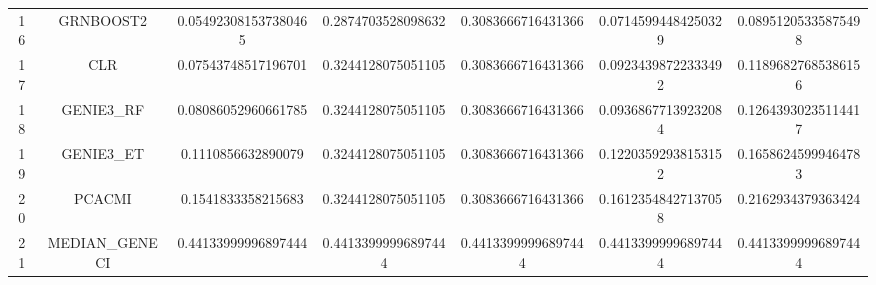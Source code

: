 \documentclass[a4paper,10pt]{article}
\begin{document}
\begin{landscape}
\begin{table}[!htp]
\begin{tabular}{ccccccc}
16&GRNBOOST2&0.054923081537380465&0.2874703528098632&0.3083666716431366&0.07145994484250329&0.08951205335875498\\
17&CLR&0.07543748517196701&0.3244128075051105&0.3083666716431366&0.09234398722333492&0.11896827685386156\\
18&GENIE3_RF&0.08086052960661785&0.3244128075051105&0.3083666716431366&0.09368677139232084&0.12643930235114417\\
19&GENIE3_ET&0.1110856632890079&0.3244128075051105&0.3083666716431366&0.12203592938153152&0.16586245999464783\\
20&PCACMI&0.1541833358215683&0.3244128075051105&0.3083666716431366&0.16123548427137058&0.2162934379363424\\
21&MEDIAN_GENECI&0.44133999996897444&0.44133999996897444&0.44133999996897444&0.44133999996897444&0.44133999996897444\\
\hline
\end{tabular}
\end{table}


\newpage


\end{landscape}
\end{document}
